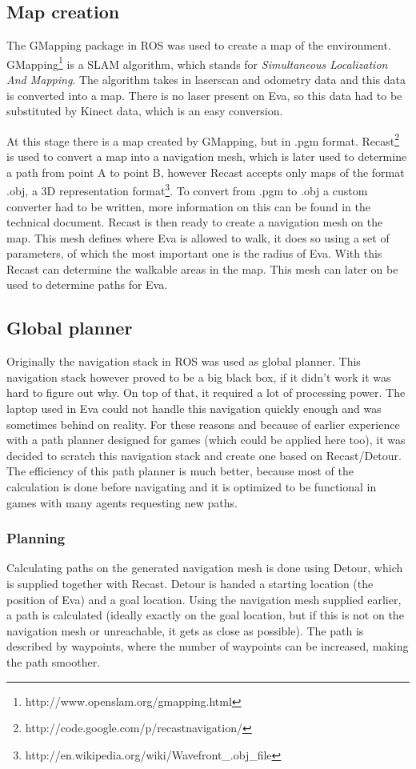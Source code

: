 \documentclass[project_eva.tex]{subfiles}
\begin{document}
\subsection*{Map creation}
The GMapping package in ROS was used to create a map of the environment. GMapping\footnote{http://www.openslam.org/gmapping.html} is a SLAM algorithm, which stands for \textit{Simultaneous Localization And Mapping}. The algorithm takes in laserscan and odometry data and this data is converted into a map. There is no laser present on Eva, so this data had to be substituted by Kinect data, which is an easy conversion.

At this stage there is a map created by GMapping, but in .pgm format. Recast\footnote{http://code.google.com/p/recastnavigation/} is used to convert a map into a navigation mesh, which is later used to determine a path from point A to point B, however Recast accepts only maps of the format .obj, a 3D representation format\footnote{http://en.wikipedia.org/wiki/Wavefront\_.obj\_file}. To convert from .pgm to .obj a custom converter had to be written, more information on this can be found in the technical document. Recast is then ready to create a navigation mesh on the map. This mesh defines where Eva is allowed to walk, it does so using a set of parameters, of which the most important one is the radius of Eva. With this Recast can determine the walkable areas in the map. This mesh can later on be used to determine paths for Eva.
\subsection*{Global planner}
Originally the navigation stack in ROS was used as global planner. This navigation stack however proved to be a big black box, if it didn't work it was hard to figure out why. On top of that, it required a lot of processing power. The laptop used in Eva could not handle this navigation quickly enough and was sometimes behind on reality. For these reasons and because of earlier experience with a path planner designed for games (which could be applied here too), it was decided to scratch this navigation stack and create one based on Recast/Detour. The efficiency of this path planner is much better, because most of the calculation is done before navigating and it is optimized to be functional in games with many agents requesting new paths.
\subsubsection*{Planning}
Calculating paths on the generated navigation mesh is done using Detour, which is supplied together with Recast. Detour is handed a starting location (the position of Eva) and a goal location. Using the navigation mesh supplied earlier, a path is calculated (ideally exactly on the goal location, but if this is not on the navigation mesh or unreachable, it gets as close as possible). The path is described by waypoints, where the number of waypoints can be increased, making the path smoother.
\end{document}

